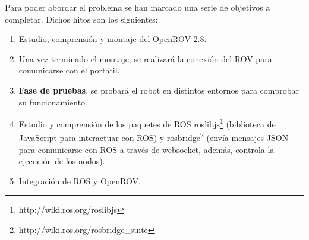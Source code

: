 Para poder abordar el problema se han marcado una serie de objetivos a completar. Dichos hitos son los siguientes:

\begin{enumerate}
\item Estudio, comprensión y montaje del OpenROV 2.8.
\item Una vez terminado el montaje, se realizará la conexión del ROV para comunicarse con el portátil.
\item \textbf{Fase de pruebas}, se probará el robot en distintos entornos para comprobar su funcionamiento.
\item Estudio y comprensión de los paquetes de ROS roslibjs\footnote{http://wiki.ros.org/roslibjs} (biblioteca de JavaScript para interactuar con ROS) y rosbridge\footnote{http://wiki.ros.org/rosbridge\_suite} (envía mensajes JSON para comunicarse con ROS a través de websocket, además, controla la ejecución de los nodos).
\item Integración de ROS y OpenROV.
\end{enumerate}